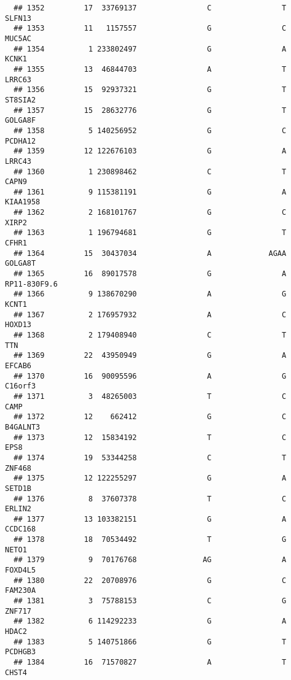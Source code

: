 \documentclass[12pt,twoside]{reedthesis}
\theoremstyle{definition}
\theoremstyle{definition}
\theoremstyle{remark}
\begin{document}
\begin{verbatim}
  ## 1352         17  33769137                C                T         SLFN13
  ## 1353         11   1157557                G                C         MUC5AC
  ## 1354          1 233802497                G                A          KCNK1
  ## 1355         13  46844703                A                T         LRRC63
  ## 1356         15  92937321                G                T        ST8SIA2
  ## 1357         15  28632776                G                T        GOLGA8F
  ## 1358          5 140256952                G                C        PCDHA12
  ## 1359         12 122676103                G                A         LRRC43
  ## 1360          1 230898462                C                T          CAPN9
  ## 1361          9 115381191                G                A       KIAA1958
  ## 1362          2 168101767                G                C          XIRP2
  ## 1363          1 196794681                G                T          CFHR1
  ## 1364         15  30437034                A             AGAA        GOLGA8T
  ## 1365         16  89017578                G                A   RP11-830F9.6
  ## 1366          9 138670290                A                G          KCNT1
  ## 1367          2 176957932                A                C         HOXD13
  ## 1368          2 179408940                C                T            TTN
  ## 1369         22  43950949                G                A         EFCAB6
  ## 1370         16  90095596                A                G        C16orf3
  ## 1371          3  48265003                T                C           CAMP
  ## 1372         12    662412                G                C       B4GALNT3
  ## 1373         12  15834192                T                C           EPS8
  ## 1374         19  53344258                C                T         ZNF468
  ## 1375         12 122255297                G                A         SETD1B
  ## 1376          8  37607378                T                C         ERLIN2
  ## 1377         13 103382151                G                A        CCDC168
  ## 1378         18  70534492                T                G          NETO1
  ## 1379          9  70176768               AG                A        FOXD4L5
  ## 1380         22  20708976                G                C        FAM230A
  ## 1381          3  75788153                C                G         ZNF717
  ## 1382          6 114292233                G                A          HDAC2
  ## 1383          5 140751866                G                T        PCDHGB3
  ## 1384         16  71570827                A                T          CHST4

\end{verbatim}
\end{document}
